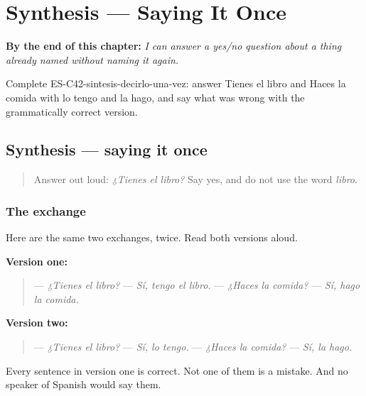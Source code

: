 
\chapter{Synthesis --- Saying It Once}
\label{ch:synthesis-say-it-once}

\begin{chapteropening}
\textbf{By the end of this chapter:} \emph{I can answer a yes/no question about a thing already named without naming it again.}

Complete ES-C42-sintesis-decirlo-una-vez: answer Tienes el libro and Haces la comida with lo tengo and la hago, and say what was wrong with the grammatically correct version.
\end{chapteropening}

\section[Practice]{Synthesis — saying it once}

\label{lesson:ES-C42-sintesis-decirlo-una-vez}



\begin{quote}
Answer out loud: \emph{¿Tienes el libro?} Say yes, and do not use the word \emph{libro}.
\end{quote}

\subsection*{The exchange}
Here are the same two exchanges, twice. Read both versions aloud.

\textbf{Version one:}

\begin{quote}
— \emph{¿Tienes el libro?} — \emph{Sí, tengo el libro.} — \emph{¿Haces la comida?} — \emph{Sí, hago la comida.}
\end{quote}

\textbf{Version two:}

\begin{quote}
— \emph{¿Tienes el libro?} — \emph{Sí, lo tengo.} — \emph{¿Haces la comida?} — \emph{Sí, la hago.}
\end{quote}

Every sentence in version one is correct. Not one of them is a mistake. And no speaker of Spanish would say them.

